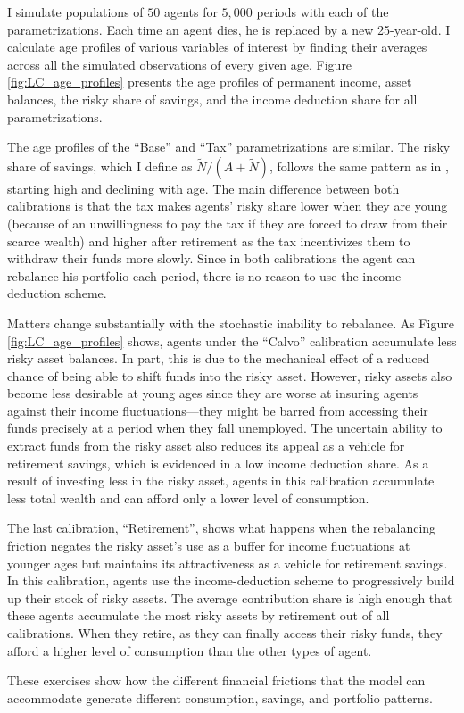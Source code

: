 \documentclass[./RiskyContrib.tex]{subfiles}
\begin{document}



I simulate populations of $50$ agents for $5,000$ periods with each of the
parametrizations. Each time an agent dies, he is replaced by a new 25-year-old.
I calculate age profiles of various variables of interest by finding their
averages across all the simulated observations of every given age. Figure 
\ref{fig:LC_age_profiles} presents the age profiles of permanent income,
asset balances, the risky share of savings, and the income deduction share
for all parametrizations.

The age profiles of the ``Base'' and ``Tax'' parametrizations are similar.
The risky share of savings, which I define as $\tilde{N}/(A + \tilde{N})$,
follows the same pattern as in \cite{Cocco2005rfs}, starting high and declining
with age. The main difference between both calibrations is that the tax
makes agents' risky share lower when they are young (because of an unwillingness
to pay the tax if they are forced to draw from their scarce wealth) and higher
after retirement as the tax incentivizes them to withdraw their funds more slowly.
Since in both calibrations the agent can rebalance his portfolio each period, there
is no reason to use the income deduction scheme.

Matters change substantially with the stochastic inability to rebalance. As Figure
\ref{fig:LC_age_profiles} shows, agents under the ``Calvo'' calibration accumulate
less risky asset balances. In part, this is due to the mechanical effect of a reduced
chance of being able to shift funds into the risky asset. However, risky assets also
become less desirable at young ages since they are worse at insuring agents against
their income fluctuations---they might be barred from accessing their funds precisely
at a period when they fall unemployed. The uncertain ability to extract funds from the
risky asset also reduces its appeal as a vehicle for retirement savings, which is
evidenced in a low income deduction share. As a result of investing less in the risky
asset, agents in this calibration accumulate less total wealth and can afford only a
lower level of consumption.

The last calibration, ``Retirement'', shows what happens when the rebalancing friction
negates the risky asset's use as a buffer for income fluctuations at younger ages but
maintains its attractiveness as a vehicle for retirement savings. In this calibration,
agents use the income-deduction scheme to progressively build up their stock of risky
assets. The average contribution share is high enough that these agents accumulate the
most risky assets by retirement out of all calibrations. When they retire, as they can
finally access their risky funds, they afford a higher level of consumption than the
other types of agent.

These exercises show how the different financial frictions that the model can
accommodate generate different consumption, savings, and portfolio patterns.

\clearpage\vfill\eject

\onlyinsubfile{}
\end{document}
